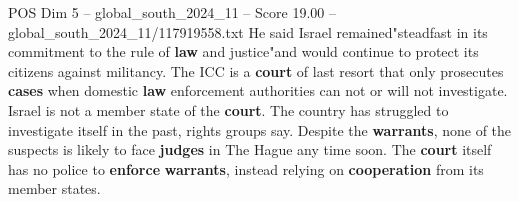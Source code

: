 \begin{textsample}{POS Dim 5 – global\_south\_2024\_11 – Score 19.00 – global\_south\_2024\_11/117919558.txt}
He said Israel remained"steadfast in its commitment to the rule of \textbf{law} and justice"and would continue to protect its citizens against militancy.
The ICC is a \textbf{court} of last resort that only prosecutes \textbf{cases} when domestic \textbf{law} enforcement authorities can not or will not investigate.
Israel is not a member state of the \textbf{court}.
The country has struggled to investigate itself in the past, rights groups say.
Despite the \textbf{warrants}, none of the suspects is likely to face \textbf{judges} in The Hague any time soon.
The \textbf{court} itself has no police to \textbf{enforce} \textbf{warrants}, instead relying on \textbf{cooperation} from its member states.

\end{textsample}
